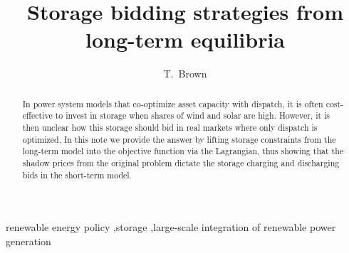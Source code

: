 \documentclass[final,3p,times]{elsarticle}
\begin{document}
\begin{frontmatter}




\title{Storage bidding strategies from long-term equilibria}




\author[kit]{T.~Brown}



\address[kit]{Institute for Automation and Applied Informatics, Karlsruhe Institute of Technology, Hermann-von-Helmholtz-Platz 1, 76344 Eggenstein-Leopoldshafen, Germany}


\begin{abstract}
  In power system models that co-optimize asset capacity with
  dispatch, it is often cost-effective to invest in storage when
  shares of wind and solar are high. However, it is then unclear how
  this storage should bid in real markets where only dispatch is
  optimized. In this note we provide the answer by lifting storage
  constraints from the long-term model into the objective function via
  the Lagrangian, thus showing that the shadow prices from the
  original problem dictate the storage charging and discharging bids in the short-term model.
\end{abstract}


\begin{keyword}
 renewable energy policy \sep storage \sep large-scale integration of renewable power generation



\end{keyword}

\end{frontmatter}
\end{document}
